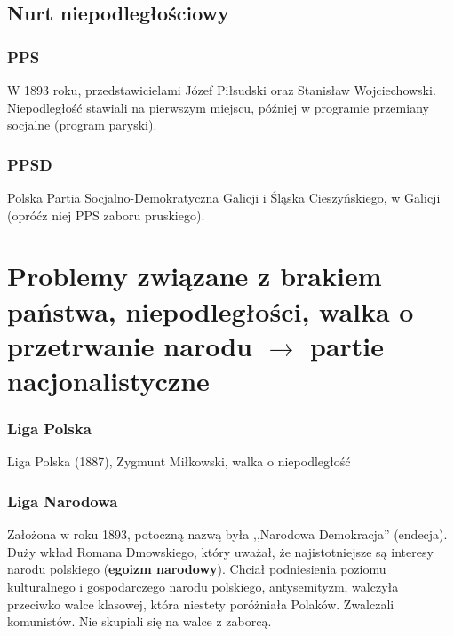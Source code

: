 \documentclass [a4paper, 11pt, oneside]{book}
\begin{document}
        \subsection{Nurt niepodległościowy} %
        \label{sub:nurt_niepodleg_o_ciowy}
            \subsubsection{PPS} %
            \label{ssub:pps}
                W 1893 roku, przedstawicielami Józef Piłsudski oraz Stanisław Wojciechowski. Niepodległość stawiali na pierwszym miejscu, później w programie przemiany socjalne (program paryski).
            \subsubsection{PPSD} %
            \label{ssub:ppsd}
                Polska Partia Socjalno-Demokratyczna Galicji i Śląska Cieszyńskiego, w Galicji (opróćz niej PPS zaboru pruskiego).
    \section{Problemy związane z brakiem państwa, niepodległości, walka o przetrwanie narodu $\mathbf\rightarrow$ partie nacjonalistyczne} %
    \label{sec:problemy_zwi_zane_z_brakiem_pa_stwa_niepodleg_o_ci_walka_o_przetrwanie_narodu_mathbfrightarrow_partie_nacjonalistyczne}
        \subsubsection{Liga Polska} %
        \label{sub:liga_polska}
            Liga Polska (1887), Zygmunt Miłkowski, walka o niepodległość
        \subsubsection{Liga Narodowa} %
        \label{ssub:liga_narodowa}
            Założona w roku 1893, potoczną nazwą była ,,Narodowa Demokracja'' (endecja). Duży wkład Romana Dmowskiego, który uważał, że najistotniejsze są interesy narodu polskiego (\textbf{egoizm narodowy}). Chciał podniesienia poziomu kulturalnego i gospodarczego narodu polskiego, antysemityzm, walczyła przeciwko walce klasowej, która niestety poróżniała Polaków. Zwalczali komunistów. Nie skupiali się na walce z zaborcą.
\end{document}
